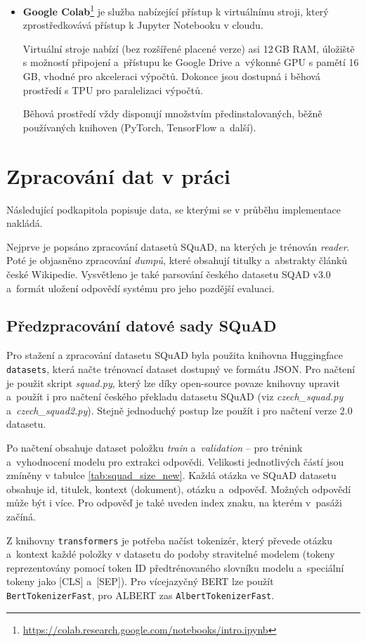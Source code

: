 \begin{itemize}
    \item \textbf{Google Colab}\footnote{\url{https://colab.research.google.com/notebooks/intro.ipynb}}
    je služba nabízející přístup k virtuálnímu stroji, který zprostředkovává přístup k Jupyter Notebooku v cloudu.\par 
    Virtuální stroje nabízí (bez rozšířené placené verze) asi 12\,GB RAM, úložiště s možností připojení a~přístupu ke Google Drive a~výkonné GPU s pamětí 16\,GB, vhodné pro akceleraci výpočtů. Dokonce jsou dostupná i běhová prostředí s TPU pro paralelizaci výpočtů.\par
    Běhová prostředí vždy disponují množstvím předinstalovaných, běžně používaných knihoven (PyTorch, TensorFlow a~další).
    
\end{itemize}

\section{Zpracování dat v práci}
\label{data_processing}
Následující podkapitola popisuje data, se kterými se v průběhu implementace nakládá. \par
Nejprve je popsáno zpracování datasetů SQuAD, na kterých je trénován \emph{reader}. Poté je objasněno zpracování \textit{dumpů}, které obsahují titulky a~abstrakty článků české Wikipedie. Vysvětleno je také parsování českého datasetu SQAD v3.0 a~formát uložení odpovědí systému pro jeho pozdější evaluaci. 

\subsection{Předzpracování datové sady SQuAD}
Pro stažení a zpracování datasetu SQuAD byla použita knihovna Huggingface \texttt{ datasets}, která načte trénovací dataset dostupný ve formátu JSON. Pro načtení je použit skript \emph{squad.py}, který lze díky open-source povaze knihovny upravit a~použít i pro načtení českého překladu datasetu SQuAD \cite{cz_suqad_download} (viz \emph{czech\_squad.py} a~\emph{czech\_squad2.py}). Stejně jednoduchý postup lze použít i pro načtení verze 2.0 datasetu.\par
Po načtení obsahuje dataset položku \emph{train} a~\emph{validation} -- pro trénink a~vyhodnocení modelu pro extrakci odpovědi. Velikosti jednotlivých částí jsou zmíněny v tabulce \ref{tab:squad_size_new}. Každá otázka ve SQuAD datasetu obsahuje id, titulek, kontext (dokument), otázku a~odpověď. Možných odpovědí může být i více. Pro odpověď je také uveden index znaku, na kterém v~pasáži začíná.\par
Z knihovny \texttt{transformers} je potřeba načíst tokenizér, který převede otázku a~kontext každé položky v datasetu do podoby stravitelné modelem (tokeny reprezentovány pomocí token ID předtrénovaného slovníku modelu a~speciální tokeny jako [CLS] a~[SEP]). Pro více\-jazyčný BERT lze použít \texttt{BertTokenizerFast}, pro ALBERT zas \texttt{AlbertTokenizerFast}.\par

